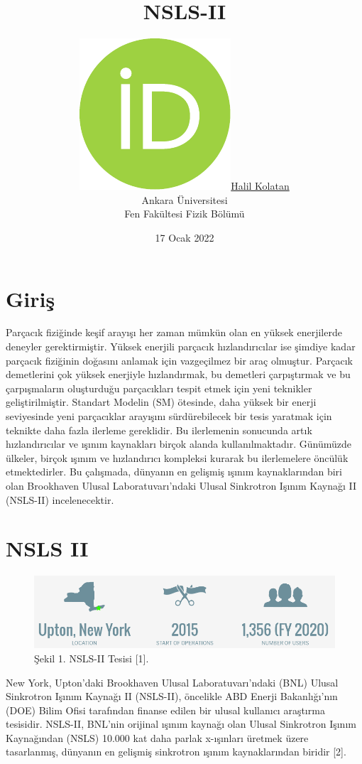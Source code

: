 \documentclass{article}
\title{NSLS-II}
\date{17 Ocak 2022}
\author{ \href{https://orcid.org/0000-0002-1684-9602}{\includegraphics[scale=0.06]{orcid.pdf}\hspace{1mm}Halil Kolatan} \\
	Ankara Üniversitesi\\
	Fen Fakültesi 
	Fizik Bölümü }\\
\begin{document}
\maketitle
\begin{abstract}
\tableofcontents
\end{abstract}
\section{Giriş}
 Parçacık fiziğinde keşif arayışı her zaman mümkün olan en yüksek enerjilerde deneyler gerektirmiştir. Yüksek enerjili parçacık hızlandırıcılar ise şimdiye kadar parçacık fiziğinin doğasını anlamak için vazgeçilmez bir araç olmuştur. Parçacık demetlerini çok yüksek enerjiyle hızlandırmak, bu demetleri çarpıştırmak ve bu çarpışmaların oluşturduğu parçacıkları tespit etmek için yeni teknikler geliştirilmiştir. Standart Modelin (SM) ötesinde, daha yüksek bir enerji seviyesinde yeni parçacıklar arayışını sürdürebilecek bir tesis yaratmak için teknikte daha fazla ilerleme gereklidir. Bu ilerlemenin sonucunda artık hızlandırıcılar ve ışınım kaynakları birçok alanda kullanılmaktadır. Günümüzde ülkeler, birçok ışınım ve hızlandırıcı kompleksi kurarak bu ilerlemelere öncülük etmektedirler. Bu çalışmada, dünyanın en gelişmiş ışınım kaynaklarından biri olan Brookhaven Ulusal Laboratuvarı'ndaki Ulusal Sinkrotron Işınım Kaynağı  II (NSLS-II) incelenecektir.
  \newpage
  
\section{NSLS II}

	\begin{figure}[h!]
 \centering
\includegraphics[width=13cm]{ssözet.png}
\caption*{Şekil 1. NSLS-II Tesisi [1].}
	\end{figure}

New York, Upton'daki Brookhaven Ulusal Laboratuvarı'ndaki (BNL) Ulusal Sinkrotron Işınım Kaynağı II (NSLS-II), öncelikle ABD Enerji Bakanlığı'nın (DOE) Bilim Ofisi tarafından finanse edilen bir ulusal kullanıcı araştırma tesisidir. NSLS-II, BNL'nin orijinal ışınım kaynağı olan Ulusal Sinkrotron Işınım Kaynağından (NSLS) 10.000 kat daha parlak x-ışınları üretmek üzere tasarlanmış, dünyanın en gelişmiş sinkrotron ışınım kaynaklarından biridir [2].
\end{document}
